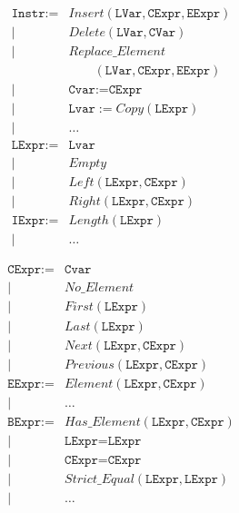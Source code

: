\documentclass[runningheads,a4paper]{llncs}
\newcommand{\Insert}{\ensuremath{\mathit{Insert}}\xspace}
\newcommand{\Delete}{\ensuremath{\mathit{Delete}}\xspace}
\newcommand{\Replace}{\ensuremath{\mathit{Replace\_Element}}\xspace}
\newcommand{\Copy}{\ensuremath{\mathit{Copy}}\xspace}
\newcommand{\Next}{\ensuremath{\mathit{Next}}\xspace}
\newcommand{\Previous}{\ensuremath{\mathit{Previous}}\xspace}
\newcommand{\First}{\ensuremath{\mathit{First}}\xspace}
\newcommand{\Last}{\ensuremath{\mathit{Last}}\xspace}
\newcommand{\Left}{\ensuremath{\mathit{Left}}\xspace}
\newcommand{\Right}{\ensuremath{\mathit{Right}}\xspace}
\newcommand{\Element}{\ensuremath{\mathit{Element}}\xspace}
\newcommand{\HasElement}{\ensuremath{\mathit{Has\_Element}}\xspace}
\newcommand{\StrictEqual}{\ensuremath{\mathit{Strict\_Equal}}\xspace}
\newcommand{\Empty}{\ensuremath{\mathit{Empty}}\xspace}
\newcommand{\NoElement}{\ensuremath{\mathit{No\_Element}}\xspace}
\newcommand{\Length}{\ensuremath{\mathit{Length}}\xspace}
\begin{document}
\small
\hspace*{-0.8cm}
\begin{minipage}[t]{0.5\linewidth}
  \begin{eqnarray*}
    & \texttt{Instr} := & \Insert (\texttt{LVar},\texttt{CExpr},\texttt{EExpr})\\
    & | & \Delete (\texttt{LVar},\texttt{CVar})\\
    & | & \Replace \\
    &   & \qquad (\texttt{LVar},\texttt{CExpr},\texttt{EExpr})\\
    & | & \texttt{Cvar} := \texttt{CExpr}\\
    & | & \texttt{Lvar} := \Copy(\texttt{LExpr})\\
    & | & \dots\\
    & \texttt{LExpr} := & \texttt{Lvar}\\
    & | & \Empty\\
    & | & \Left (\texttt{LExpr},\texttt{CExpr})\\
    & | & \Right (\texttt{LExpr},\texttt{CExpr})\\
    & \texttt{IExpr} := & \Length (\texttt{LExpr})\\
    & | & \dots
  \end{eqnarray*}
\end{minipage}
\begin{minipage}[t]{0.5\linewidth}
  \begin{eqnarray*}
    & \texttt{CExpr} := & \texttt{Cvar}\\
    & | & \NoElement\\
    & | & \First (\texttt{LExpr})\\
    & | & \Last (\texttt{LExpr})\\
    & | & \Next (\texttt{LExpr},\texttt{CExpr})\\
    & | & \Previous (\texttt{LExpr},\texttt{CExpr})\\
    & \texttt{EExpr} := & \Element (\texttt{LExpr},\texttt{CExpr})\\
    & | & \dots\\
    & \texttt{BExpr} := & \HasElement (\texttt{LExpr},\texttt{CExpr})\\
    & | & \texttt{LExpr}=\texttt{LExpr}\\
    & | & \texttt{CExpr}=\texttt{CExpr}\\
    & | & \StrictEqual (\texttt{LExpr},\texttt{LExpr})\\
    & | & \dots\\
  \end{eqnarray*}
\end{minipage}
\normalsize
\end{document}
